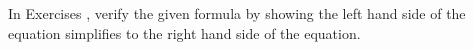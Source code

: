{\noindent In Exercises}
{, verify the given formula by showing the left hand side of the equation simplifies to the right hand side of the equation.}

